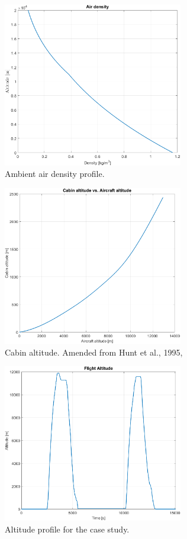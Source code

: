 \documentclass[english]{kththesis}
\begin{document}
\begin{figure}[!ht]
    \centering
    \includegraphics[width=0.7\textwidth]{Epictures/AirDensity.png}
    \caption{Ambient air density profile.}
    \label{fig:Rhoamb}
\end{figure}

\begin{figure}[!ht]
    \centering
    \includegraphics[width=0.7\textwidth]{Epictures/CabinAltitude.png}
    \caption{Cabin altitude. Amended from Hunt et al., 1995, \cite{Hunt1995}}
    \label{fig:CabinAlt}
\end{figure}

\begin{figure}[!ht]
    \centering
    \includegraphics[width=0.7\textwidth]{Epictures/FlightAltitude.png}
    \caption{Altitude profile for the case study.}
    \label{fig:FlightAltitude}
\end{figure}
\end{document}
